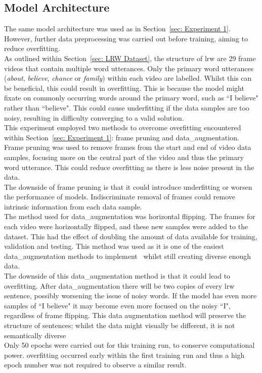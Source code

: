 \subsection{Model Architecture}
The same model architecture was used as in Section~\ref{sec: Experiment 1}. However, further data preprocessing was carried out before training, aiming to reduce \gls{overfitting}.\\
As outlined within Section~\ref{sec: LRW Dataset}, the structure of \gls{lrw} are 29 frame videos that contain multiple word utterances. Only the primary word utterances (\emph{about}, \emph{believe}, \emph{chance} or \emph{family}) within each video are labelled. Whilst this can be beneficial, this could result in \gls{overfitting}. This is because the model might fixate on commonly occurring words around the primary word, such as ``I believe" rather than ``believe". This could cause \gls{underfitting} if the data samples are too noisy, resulting in difficulty converging to a valid solution.\\
This experiment employed two methods to overcome \gls{overfitting} encountered within Section~\ref{sec: Experiment 1}: frame pruning and \gls{data_augmentation}.\\
Frame pruning was used to remove frames from the start and end of video data samples, focusing more on the central part of the video and thus the primary word utterance. This could reduce \gls{overfitting} as there is less noise present in the data.\\
The downside of frame pruning is that it could introduce \gls{underfitting} or worsen the performance of models. Indiscriminate removal of frames could remove intrinsic information from each data sample.\\
The method used for \gls{data_augmentation} was horizontal flipping. The frames for each video were horizontally flipped, and these new samples were added to the dataset. This had the effect of doubling the amount of data available for training, validation and testing. This method was used as it is one of the easiest \gls{data_augmentation} methods to implement~\cite{og_data_augmentation} whilst still creating diverse enough data.\\
The downside of this \gls{data_augmentation} method is that it could lead to \gls{overfitting}. After \gls{data_augmentation} there will be two copies of every \gls{lrw} sentence, possibly worsening the issue of noisy words. If the model has even more samples of ``I believe" it may become even more focused on the noisy ``I", regardless of frame flipping. This data augmentation method will preserve the structure of sentences; whilst the data might visually be different, it is not semantically diverse\\
Only 50 epochs were carried out for this training run, to conserve computational power. \Gls{overfitting} occurred early within the first training run and thus a high epoch number was not required to observe a similar result.
